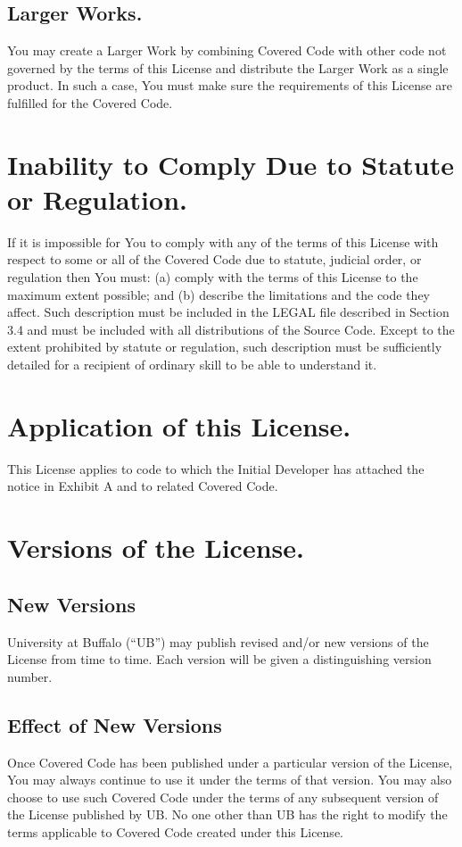 \documentclass[letterpaper,colorlinks=true,linkcolor=blue]{book}
\begin{document}
\subsection{Larger Works.}
You may create a Larger Work by combining Covered Code with other code not governed by the terms of this License and distribute the Larger Work as a single product. In such a case, You must make sure the requirements of this License are fulfilled for the Covered Code. 


\section{Inability to Comply Due to Statute or Regulation.}
If it is impossible for You to comply with any of the terms of this License with respect to some or all of the Covered Code due to statute, judicial order, or regulation then You must: (a) comply with the terms of this License to the maximum extent possible; and (b) describe the limitations and the code they affect. Such description must be included in the LEGAL file described in Section 3.4 and must be included with all distributions of the Source Code. Except to the extent prohibited by statute or regulation, such description must be sufficiently detailed for a recipient of ordinary skill to be able to understand it. 

\section{Application of this License.}
This License applies to code to which the Initial Developer has attached the notice in Exhibit A and to related Covered Code. 

\section{Versions of the License.}
\subsection{New Versions}
University at Buffalo (``UB'') may publish revised and/or new versions of the License from time to time. Each version will be given a distinguishing version number. 

\subsection{Effect of New Versions}
Once Covered Code has been published under a particular version of the License, You may always continue to use it under the terms of that version. You may also choose to use such Covered Code under the terms of any subsequent version of the License published by UB. No one other than UB has the right to modify the terms applicable to Covered Code created under this License. 
\end{document}
